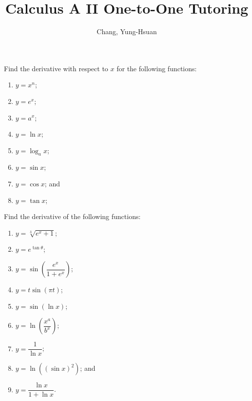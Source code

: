 \documentclass[11pt]{article}
\title{\textbf{Calculus A II One-to-One Tutoring}}
\author{Chang, Yung-Hsuan}
\theoremstyle{break}
\numberwithin{equation}{theorem}
\begin{document}
\maketitle

\begin{question}
    Find the derivative with respect to $x$ for the following functions: \vspace{-1.2em}
    \begin{multicols}{4}
        \begin{enumerate}
            \item $y=x^n$;
            \item $y=e^x$;
            \item $y=a^x$;
            \item $y=\ln x$;
            \item $y=\log_a x$;
            \item $y=\sin x$;
            \item $y=\cos x$; and
            \item $y=\tan x$;
        \end{enumerate}
    \end{multicols}
    \vspace{0.01em}
\end{question}
\newpage

\begin{question}
    Find the derivative of the following functions: \vspace{-1.4em}
    \begin{multicols}{2}
        \begin{enumerate}
            \item $y=\sqrt[3]{e^x+1}$;
            \item $y=e^{\tan\theta}$;
            \item $y=\sin\left(\dfrac{e^x}{1+e^x}\right)$;
            \item $y=t\sin\left(\pi t\right)$;
            \item $y=\sin(\ln x)$;
            \item $y=\ln\left(\dfrac{x^a}{b^x}\right)$;
            \item $y=\dfrac{1}{\ln x}$;
            \item $y=\ln\left(\left(\sin x\right)^2\right)$; and
            \item $y=\dfrac{\ln x}{1+\ln x}$.
        \end{enumerate}
    \end{multicols}
    \vspace{0.01em}
\end{question}
\newpage
\end{document}
